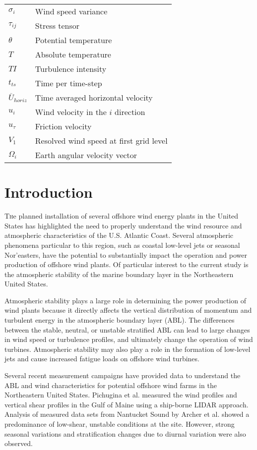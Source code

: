 \documentclass[conf]{new-aiaa}
\begin{document}
{\begin{longtable*}{@{}l @{\quad=\quad} l@{}}
$\sigma_i$ & Wind speed variance \\
$\tau_{ij}$ & Stress tensor \\
$\theta$  & Potential temperature \\
$T$       & Absolute temperature \\
$TI$      & Turbulence intensity \\
$t_{ts}$  & Time per time-step \\
$\overline{U}_{horiz}$ & Time averaged horizontal velocity \\
$u_i$     & Wind velocity in the $i$ direction  \\
$u_\tau$   & Friction velocity    \\
$V_1$     & Resolved wind speed at first grid level \\
$\Omega_i$ & Earth angular velocity vector
\end{longtable*}}

\section{Introduction}

\lettrine{T}he planned installation of several offshore wind energy
plants in the United States has highlighted the need to properly
understand the wind resource and atmospheric characteristics of the U.S.
Atlantic Coast.  Several atmospheric phenomena particular to this
region, such as coastal low-level jets or seasonal Nor’easters, have
the potential to substantially impact the operation and power
production of offshore wind plants.  Of particular interest to the
current study is the atmospheric stability of the marine boundary
layer in the Northeastern United States.

Atmospheric stability plays a large role in determining the power
production of wind plants because it directly affects the vertical
distribution of momentum and turbulent energy in the atmospheric
boundary layer (ABL).  The differences between the stable, neutral, or
unstable stratified ABL can lead to large changes in wind speed or
turbulence profiles, and ultimately change the operation of wind
turbines.  Atmospheric stability may also play a role in the formation
of low-level jets \cite{nunalee2014mesoscale} and cause increased
fatigue loads on offshore wind turbines.

Several recent measurement campaigns have provided data to understand
the ABL and wind characteristics for potential offshore wind farms in
the Northeastern United States.  Pichugina et al. \cite{pichugina2017properties}
measured the wind profiles and vertical shear profiles in the Gulf of
Maine using a ship-borne LIDAR approach.  Analysis of measured data
sets from Nantucket Sound by Archer et
al. \cite{archer2016predominance} showed a predominance of low-shear,
unstable conditions at the site.  However, strong seasonal variations
and stratification changes due to diurnal variation were also
observed.
\end{document}
